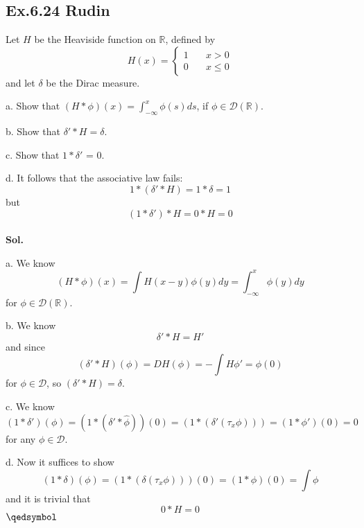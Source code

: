 \documentclass[lang=en,11pt,a4paper,citestyle =authoryear]{elegantpaper}
\newcommand{\prvd}{$\hfill \qedsymbol$}
\newcommand{\R}{\mathbb{R}}
\newcommand{\D}{\mathscr{D}}
\begin{document}
\subsection*{Ex.6.24 Rudin} 
Let $H$ be the Heaviside function on $\R$, defined by
\[
H(x) = \begin{cases}
    1\quad& x > 0 \\
    0&x\leq 0
\end{cases}
\]
and let $\delta$ be the Dirac measure.\par
a. Show that $(H*\phi)(x) = \int_{-\infty}^x \phi(s)ds$, if $\phi \in \D(\R)$.\par
b. Show that $\delta' * H = \delta$.\par
c. Show that $1*\delta'$ = 0.\par
d. It follows that the associative law fails:
\[1*(\delta'*H) = 1*\delta = 1\]
but
\[(1*\delta')*H = 0 * H = 0\]
\vspace{0.5em}\\
\textbf{Sol.} \par
a. We know
\[(H*\phi)(x) = \int H(x-y)\phi(y) dy = \int_{-\infty}^{x}\phi(y)dy\]
for $\phi \in \D(\R)$.\par
b. We know
\[\delta'*H = H'\]
and since
\[
(\delta'*H)(\phi) = DH(\phi) = -\int H\phi' = \phi(0)
\]
for $\phi \in \D$, so $(\delta'*H) = \delta$.\par
c. We know
\[(1*\delta')(\phi) = (1*(\delta'*\hat{\phi}))(0) = (1*(\delta'(\tau_x\phi))) = (1*\phi')(0) = 0\]
for any $\phi \in \D$.\par
d. Now it suffices to show
\[(1*\delta)(\phi) = (1*(\delta(\tau_x{\phi})))(0) = (1*\phi)(0) = \int \phi\]
and it is trivial that
\[
0*H = 0
\]
\prvd

\addappheadtotoc
\end{document}
